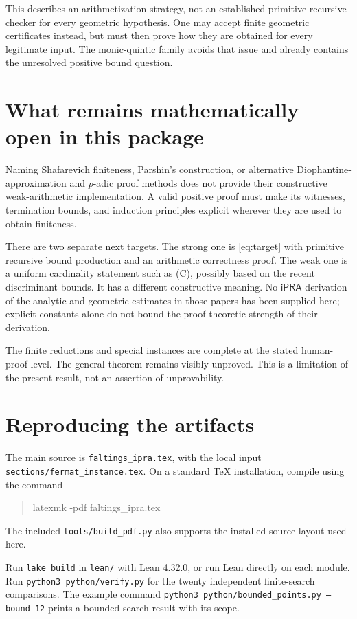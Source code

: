\documentclass[11pt,letterpaper]{article}
\newcommand{\iPRA}{\mathsf{iPRA}}
\theoremstyle{definition}
\begin{document}
This describes an arithmetization strategy, not an established primitive
recursive checker for every geometric hypothesis. One may accept finite
geometric certificates instead, but must then prove how they are obtained
for every legitimate input. The monic-quintic family avoids that issue
and already contains the unresolved positive bound question.

\section{What remains mathematically open in this package}
Naming Shafarevich finiteness, Parshin's construction, or alternative
Diophantine-approximation and $p$-adic proof methods does not provide
their constructive weak-arithmetic implementation. A valid positive
proof must make its witnesses, termination bounds, and induction
principles explicit wherever they are used to obtain finiteness.

There are two separate next targets. The strong one is \eqref{eq:target}
with primitive recursive bound production and an arithmetic correctness
proof. The weak one is a uniform cardinality statement such as (C),
possibly based on the recent discriminant bounds. It has a different
constructive meaning. No $\iPRA$ derivation of the analytic and geometric
estimates in those papers has been supplied here; explicit constants
alone do not bound the proof-theoretic strength of their derivation.

The finite reductions and special instances are complete at the stated
human-proof level. The general theorem remains visibly unproved.
This is a limitation of the present result, not an assertion of
unprovability.

\appendix
\section{Reproducing the artifacts}
The main source is \texttt{faltings\_ipra.tex}, with the local input
\texttt{sections/fermat\_instance.tex}. On a standard TeX installation,
compile using the command
\begin{quote}\ttfamily latexmk -pdf faltings\_ipra.tex\end{quote}
The included
\texttt{tools/build\_pdf.py} also supports the installed source layout
used here.

Run \texttt{lake build} in \texttt{lean/} with Lean 4.32.0, or run Lean
directly on each module. Run \texttt{python3 python/verify.py} for the
twenty independent finite-search comparisons.
The example command \texttt{python3 python/bounded\_points.py --bound 12}
prints a bounded-search result with its scope.
\end{document}
